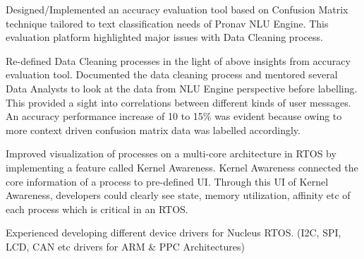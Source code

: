 \documentclass[]{deedy-resume-openfont}
\begin{document}
\begin{minipage}[t]{0.63\textwidth}
\begin{tightemize}
\item Designed/Implemented an accuracy evaluation tool based on Confusion Matrix technique tailored to text classification needs of Pronav NLU Engine. This evaluation platform highlighted major issues with Data Cleaning process. 

\item Re-defined Data Cleaning processes in the light of above insights from accuracy evaluation tool. Documented the data cleaning process and mentored several Data Analysts to look at the data from NLU Engine perspective before labelling. This provided a sight into correlations between different kinds of user messages. An accuracy performance increase of 10 to 15\% was evident because owing to more context driven confusion matrix data was labelled accordingly.


\end{tightemize}
\sectionsep


\begin{tightemize}

\item Improved visualization of processes on a multi-core architecture in RTOS by implementing a feature called Kernel Awareness. Kernel Awareness connected the core information of a process to pre-defined UI. Through this UI of Kernel Awareness, developers could clearly see state, memory utilization, affinity etc of each process which is critical in an RTOS.

\item Experienced developing different device drivers for Nucleus RTOS. (I2C, SPI, LCD, CAN etc drivers for ARM \& PPC Architectures)

\end{tightemize}
\sectionsep


\end{minipage}
\end{document}
